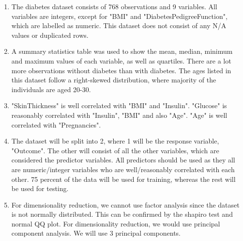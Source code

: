\documentclass[12pt]{article}
\begin{document}
\begin{enumerate} 
	
	\item The diabetes dataset consists of 768 observations and 9 variables. All variables are integers, except for "BMI" and "DiabetesPedigreeFunction", which are labelled as numeric. This dataset does not consist of any N/A values or duplicated rows. 
	
	\item A summary statistics table was used to show the mean, median, minimum and maximum values of each variable, as well as quartiles. There are a lot more observations without diabetes than with diabetes. The ages listed in this dataset follow a right-skewed distribution, where majority of the individuals are aged 20-30. 
	
	\item "SkinThickness" is well correlated with "BMI" and "Insulin". "Glucose" is reasonably correlated with "Insulin", "BMI" and also "Age". "Age" is well correlated with "Pregnancies". 
	
	\item The dataset will be split into 2, where 1 will be the response variable, "Outcome". The other will consist of all the other variables, which are considered the predictor variables. All predictors should be used as they all are numeric/integer variables who are well/reasonably correlated with each other. 75 percent of the data will be used for training, whereas the rest will be used for testing. 
	
	\item For dimensionality reduction, we cannot use factor analysis since the dataset is not normally distributed. This can be confirmed by the shapiro test and normal QQ plot. For dimensionality reduction, we would use principal component analysis. We will use 3 principal components.\\  
	
	
	
		
		
		
		
		
	
	
	

\end{enumerate}
\end{document}
